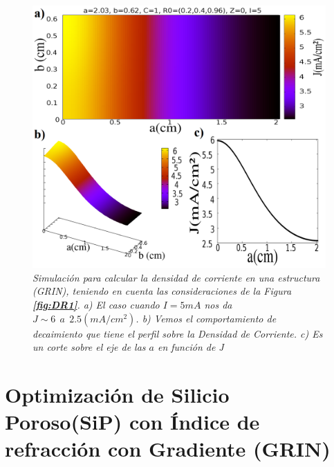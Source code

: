 \documentclass[a4paper,11pt,]{book}
\begin{document}
\begin{figure}[H]
	\centering
	\includegraphics[scale=0.3]{../Images/j51}
	\caption{\emph{Simulación para calcular la densidad de corriente en una estructura  (GRIN), teniendo en cuenta las consideraciones de  la Figura \textbf{\ref{fig:DR1}}. a) El caso cuando $I=5 mA$ nos da $J\sim 6 \ \ a \ \ 2.5 (mA/cm^2) $. b) Vemos el comportamiento de decaimiento que tiene el perfil sobre la Densidad de Corriente. c) Es un corte sobre el eje de las $a$ en función de J}}
	\label{fig:DR2}
\end{figure}
\chapter{Optimización de Silicio Poroso(SiP) con Índice de refracción con Gradiente (GRIN)}
\label{Mo:MODELOGRIN}
\end{document}
